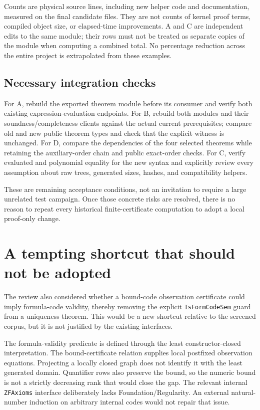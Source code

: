 \documentclass[11pt,letterpaper]{article}
\newcommand{\code}[1]{{\small\nolinkurl{#1}}}
\begin{document}
Counts are physical source lines, including new helper code and documentation, measured on the final candidate files. They are not counts of kernel proof terms, compiled object size, or elapsed-time improvements. A and C are independent edits to the same module; their rows must not be treated as separate copies of the module when computing a combined total. No percentage reduction across the entire project is extrapolated from these examples.

\subsection{Necessary integration checks}

For A, rebuild the exported theorem module before its consumer and verify both existing expression-evaluation endpoints. For B, rebuild both modules and their soundness/completeness clients against the actual current prerequisites; compare old and new public theorem types and check that the explicit witness is unchanged. For D, compare the dependencies of the four selected theorems while retaining the auxiliary-order chain and public exact-order checks. For C, verify evaluated and polynomial equality for the new syntax and explicitly review every assumption about raw trees, generated sizes, hashes, and compatibility helpers.

These are remaining acceptance conditions, not an invitation to require a large unrelated test campaign. Once those concrete risks are resolved, there is no reason to repeat every historical finite-certificate computation to adopt a local proof-only change.

\section{A tempting shortcut that should not be adopted}

The review also considered whether a bound-code observation certificate could imply formula-code validity, thereby removing the explicit \code{IsFormCodeSem} guard from a uniqueness theorem. This would be a new shortcut relative to the screened corpus, but it is not justified by the existing interfaces.

The formula-validity predicate is defined through the least constructor-closed interpretation. The bound-certificate relation supplies local postfixed observation equations. Projecting a locally closed graph does not identify it with the least generated domain. Quantifier rows also preserve the bound, so the numeric bound is not a strictly decreasing rank that would close the gap. The relevant internal \code{ZFAxioms} interface deliberately lacks Foundation/Regularity. An external natural-number induction on arbitrary internal codes would not repair that issue.\cite{boundcode,formulaclosed}
\end{document}
